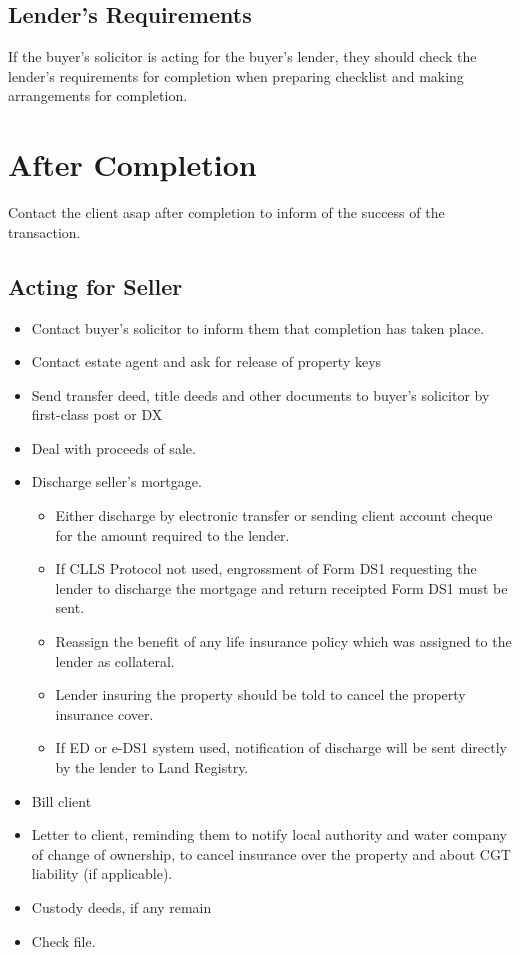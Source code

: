 \documentclass[
]{article}
\providecommand{\tightlist}{%
  \setlength{\itemsep}{0pt}\setlength{\parskip}{0pt}}
\begin{document}
\hypertarget{lenders-requirements}{%
\subsection{Lender's Requirements}\label{lenders-requirements}}

If the buyer's solicitor is acting for the buyer's lender, they should
check the lender's requirements for completion when preparing checklist
and making arrangements for completion.

\hypertarget{after-completion}{%
\section{After Completion}\label{after-completion}}

Contact the client asap after completion to inform of the success of the
transaction.

\hypertarget{acting-for-seller}{%
\subsection{Acting for Seller}\label{acting-for-seller}}

\begin{itemize}
\tightlist
\item
  Contact buyer's solicitor to inform them that completion has taken
  place.
\item
  Contact estate agent and ask for release of property keys
\item
  Send transfer deed, title deeds and other documents to buyer's
  solicitor by first-class post or DX
\item
  Deal with proceeds of sale.
\item
  Discharge seller's mortgage.

  \begin{itemize}
  \tightlist
  \item
    Either discharge by electronic transfer or sending client account
    cheque for the amount required to the lender.
  \item
    If CLLS Protocol not used, engrossment of Form DS1 requesting the
    lender to discharge the mortgage and return receipted Form DS1 must
    be sent.
  \item
    Reassign the benefit of any life insurance policy which was assigned
    to the lender as collateral.
  \item
    Lender insuring the property should be told to cancel the property
    insurance cover.
  \item
    If ED or e-DS1 system used, notification of discharge will be sent
    directly by the lender to Land Registry.
  \end{itemize}
\item
  Bill client
\item
  Letter to client, reminding them to notify local authority and water
  company of change of ownership, to cancel insurance over the property
  and about CGT liability (if applicable).
\item
  Custody deeds, if any remain
\item
  Check file.
\end{itemize}
\end{document}
